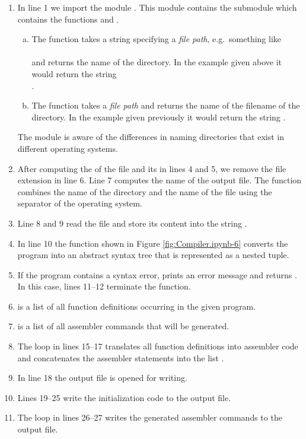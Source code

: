 \begin{enumerate}
\item In line 1 we import the module .  This module contains the submodule  which
      contains the functions   and .
      \begin{enumerate}[(a)]
      \item The function  takes a string specifying a \textsl{file path}, e.g.~something like
            \\[0.2cm]
            \hspace*{1.3cm}
            \\[0.2cm]
            and returns the name of the directory.  In the example given above it would return the string
            \\[0.2cm]
            \hspace*{1.3cm}
            . 
      \item The function  takes a \textsl{file path}
            and returns the name of the filename of the directory.  In the example given previously
            it would return the string .
      \end{enumerate}
      The module  is aware of the differences in naming directories that exist in different operating
      systems.     
\item After computing the  of the file and its  in lines 4 and 5, we remove the 
      file extension  in line 6.  Line 7 computes the name of the output file.  The function
       combines the name of the directory and the name of the file using the separator of
      the operating system.
\item Line 8 and 9 read the file and store its content into the string .
\item In line 10 the function  shown in Figure \ref{fig:Compiler.ipynb-6} converts the
      program into an abstract syntax tree that is represented as a nested tuple.
\item If the program contains a syntax error,  prints an error message and returns
      .  In this case, lines 11--12 terminate the function.
\item {} is a list of all function definitions occurring in the given program.
\item {} is a list of all assembler commands that will be generated.
\item The  loop in lines 15--17 translates all function definitions into assembler code
      and concatenates the assembler statements into the list .
\item In line 18 the output file is opened for writing.
\item Lines 19--25 write the initialization code to the output file.
\item The  loop in lines 26--27 writes the generated assembler commands to the output file.
\end{enumerate}
